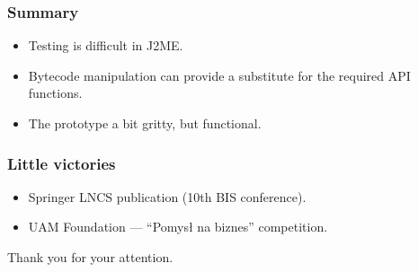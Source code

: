 \documentclass[compress]{beamer}
\begin{document}
\begin{frame}[plain]
    \frametitle{Summary}

    \begin{itemize}
        \item Testing is difficult in J2ME.
        \item Bytecode manipulation can provide a substitute 
        for the required API functions. 
    \end{itemize}

    \medskip
    \begin{itemize}
        \item The prototype a bit gritty, but functional.
    \end{itemize}
\end{frame}

\begin{frame}[plain]
    \frametitle{Little victories}

    \begin{itemize}
        \item Springer LNCS publication (10th BIS conference).
        \item UAM Foundation --- ``Pomysł na biznes'' competition.
    \end{itemize}
\end{frame}

\begin{frame}[plain]
	\begin{center}
	Thank you for your attention.
	\end{center}
\end{frame}
\end{document}
